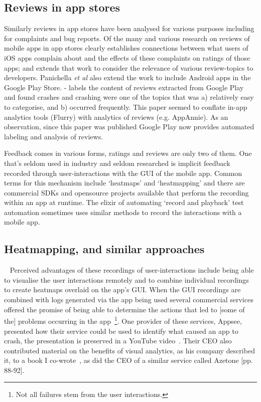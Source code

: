 \subsection{Reviews in app stores}
Similarly reviews in app stores have been analysed for various purposes including for complaints and bug reports. Of the many and various research on reviews of mobile apps in app stores \citet{khalid2015_what_do_mobile_app_users_complain_about} clearly establishes connections between what users of iOS apps complain about and the effects of these complaints on ratings of those apps; and \citet{panichella2015_how_can_i_improve_my_app_classifying_user_reviews_for_sw_maintenance_and_evolution} extends that work to consider the relevance of various review-topics to developers. Panichella \emph{et al} also extend the work to include Android apps in the Google Play Store. \citet{mcilroy2016_analyzing_and_automatically_labelling_the_types_of_user_issues_raised_in_mobile_app_reviews} - labels the content of reviews extracted from Google Play and found crashes and crashing were one of the topics that was a) relatively easy to categorise, and b) occurred frequently. This paper seemed to conflate in-app analytics tools (Flurry) with analytics of reviews (e.g. AppAnnie). As an observation, since this paper was published Google Play now provides automated labeling and analysis of reviews.

Feedback comes in various forms, ratings and reviews are only two of them.  One that's seldom used in industry and seldom researched is implicit feedback recorded through user-interactions with the GUI of the mobile app. Common terms for this mechanism include `heatmaps' and `heatmapping' and there are commercial SDKs and opensource projects available that perform the recording within an app at runtime. The elixir of automating `record and playback' test automation sometimes uses similar methods to record the interactions with a mobile app. 

\subsection{Heatmapping, and similar approaches}~\label{section-heatmapping} 
Perceived advantages of these recordings of user-interactions include being able to visualise the user interactions remotely and to combine individual recordings to create heatmaps overlaid on the app's GUI. When the GUI recordings are combined with logs generated via the app being used several commercial services offered the promise of being able to determine the actions that led to [some of the] problems occurring in the app~\footnote{Not all failures stem from the user interactions.}. One provider of these services, Appsee, presented how their service could be used to identify what caused an app to crash, the presentation is preserved in a YouTube video~\citep{appsee2015_youtube_visual_analytics_budapest_mobile_meetup}. Their CEO also contributed material on the benefits of visual analytics, as his company described it, to a book I co-wrote~\citep[pp. 94-95]{harty_aymer_playbook_2016}, as did the CEO of a similar service called Azetone [pp. 88-92]. %

